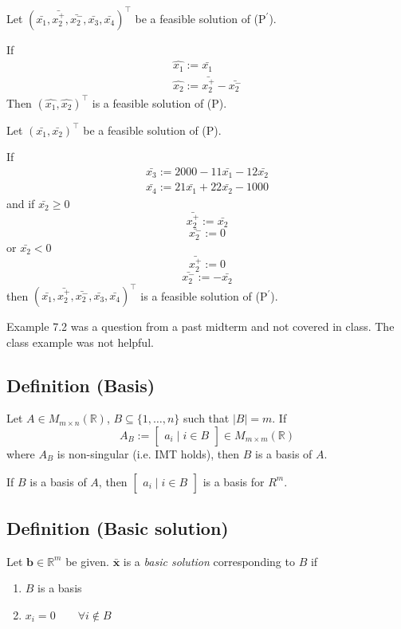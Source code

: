 Let
$(\bar{x_1}, \bar{x_2^+}, \bar{x_2^-}, \bar{x_3}, \bar{x_4})^\top$
be a feasible solution of (P$^\prime$).


If
\begin{align*}
    \hat{x_1}:=\bar{x_1}\\
    \hat{x_2}:=\bar{x_2^+}-\bar{x_2^-}
\end{align*}
Then 
$(\hat{x_1},\hat{x_2})^\top$
is a feasible solution of (P).

Let
$(\bar{x_1}, \bar{x_2})^\top$
be a feasible solution of (P).

If
\begin{align*}
    \bar{x_3}:=2000-11\bar{x_1}-12\bar{x_2}\\
    \bar{x_4}:=21\bar{x_1}+22\bar{x_2}-1000
\end{align*}
and 
if $\bar{x_2}\ge 0$
\[\bar{x_2^+}:=\bar{x_2}\]
\[\bar{x_2^-}:=0\]
or $\bar{x_2}< 0$
\[\bar{x_2^+}:=0\]
\[\bar{x_2^-}:=-\bar{x_2}\]
then $(\bar{x_1},\bar{x_2^+},\bar{x_2^-},\bar{x_3},\bar{x_4})^\top$
is a feasible solution of (P$^\prime$).
\begin{remark}
    Example 7.2 was a question from a past midterm and not covered in class. The class example was
    not helpful.
\end{remark}

\subsection{Definition (Basis)}
Let $A\in M_{m\times n}(\mathbb{R})$, $B\subseteq\{1,\dots,n\}$ such that $|B|=m$. If
\[A_B:=
\begin{bmatrix}
    a_i \mid i\in B
\end{bmatrix}\in M_{m\times m}(\mathbb{R})
\]
where $A_B$ is non-singular (i.e. IMT holds), then $B$ is a basis of $A$.


If $B$ is a basis of $A$, then 
$\begin{bmatrix}
    a_i \mid i\in B
\end{bmatrix}$
is a basis for $R^m$.

\subsection{Definition (Basic solution)}
Let $\mathbf{b}\in\mathbb{R}^m$ be given. $\mathbf{\bar{x}}$ is a \emph{basic solution} 
corresponding to $B$ if
\begin{enumerate}
    \item $B$ is a basis
    \item $x_i=0 \qquad \forall i\notin B$
\end{enumerate}

